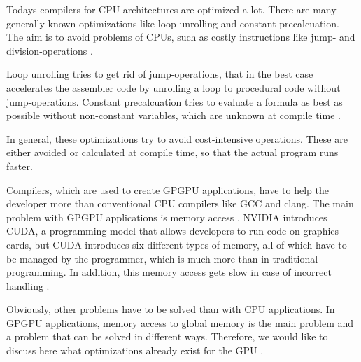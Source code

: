 \documentclass[conference]{IEEEtran}
\begin{document}
	Todays compilers for CPU architectures are optimized a lot. There are many generally known optimizations like loop unrolling and constant precalcuation. The aim is to avoid problems of CPUs, such as costly instructions like jump- and division-operations \cite{gcc_optimize_options}.
	
	Loop unrolling tries to get rid of jump-operations, that in the best case accelerates the assembler code by unrolling a loop to procedural code without jump-operations. Constant precalcuation tries to evaluate a formula as best as possible without non-constant variables, which are unknown at compile time \cite{gcc_optimize_options}.
	
	In general, these optimizations try to avoid cost-intensive operations. These are either avoided or calculated at compile time, so that the actual program runs faster. 
	
	Compilers, which are used to create GPGPU applications, have to help the developer more than conventional CPU compilers like GCC and clang. The main problem with GPGPU applications is memory access \cite{harris2007optimizing}. NVIDIA introduces CUDA, a programming model that allows developers to run code on graphics cards, but CUDA introduces six different types of memory, all of which have to be managed by the programmer, which is much more than in traditional programming. In addition, this memory access gets slow in case of incorrect handling \cite{nvidia_cuda} \cite{nvidia_developer_documentation}.
	
	Obviously, other problems have to be solved than with CPU applications. In GPGPU applications, memory access to global memory is the main problem and a problem that can be solved in different ways.
	Therefore, we would like to discuss here what optimizations already exist for the GPU \cite{nvidia_cuda} \cite{nvidia_developer_documentation}.
	
		
	
			
\end{document}
